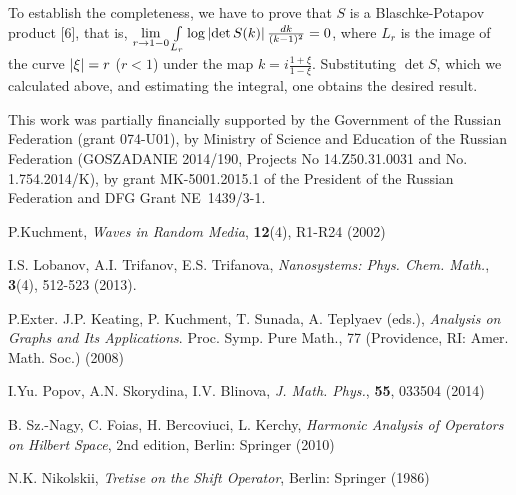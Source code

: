 \documentclass[12pt,twoside]{article}
\begin{document}
To establish the completeness, we have to prove that $S$ is a Blaschke-Potapov product [6], that is, $\lim\limits_{r \to 1 - 0} \int\limits_{L_r} \log  \left|\det S(k)\right| \frac{dk}{(k - 1)^2} = 0$, where $L_r$ is the image of the curve $\left|\xi\right| = r$ ($r < 1$) under the map $k = i \frac{1 + \xi}{1 - \xi}$. Substituting $\det S$, which we calculated above, and estimating the integral, one obtains the desired result.

This work was partially financially supported by the Government of the Russian Federation (grant 074-U01), by Ministry of Science and Education of the Russian Federation (GOSZADANIE 2014/190, Projects No 14.Z50.31.0031 and No. 1.754.2014/K), by grant MK-5001.2015.1 of the President of the Russian Federation and DFG Grant NE~1439/3-1.

\begin{thebibliography}{9}

 P.Kuchment, \textit{Waves in Random Media}, \textbf{12}(4), R1-R24 (2002)

 I.S. Lobanov, A.I. Trifanov, E.S. Trifanova, \textit{Nanosystems: Phys. Chem. Math.}, \textbf{3}(4), 512-523 (2013).

 P.Exter. J.P. Keating, P. Kuchment, T. Sunada, A. Teplyaev (eds.), \textit{Analysis on Graphs and Its Applications}. Proc. Symp. Pure Math., 77 (Providence, RI: Amer. Math. Soc.) (2008)

 I.Yu. Popov, A.N. Skorydina, I.V. Blinova, \textit{J. Math. Phys.}, \textbf{55}, 033504 (2014)

 B. Sz.-Nagy, C. Foias, H. Bercoviuci, L. Kerchy, \textit{Harmonic Analysis of Operators on Hilbert Space}, 2nd edition, Berlin: Springer (2010)

 N.K. Nikolskii, \textit{Tretise on the Shift Operator}, Berlin: Springer (1986) 

\end{thebibliography}
\end{document}
